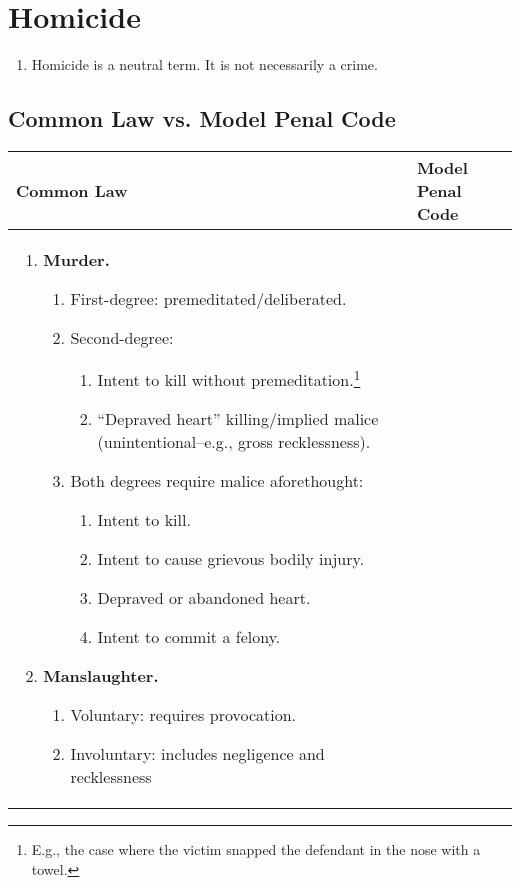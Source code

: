 \section{Homicide}

\begin{enumerate}
    \item Homicide is a neutral term. It is not necessarily a crime.
\end{enumerate}

\subsection{Common Law vs. Model Penal Code}

\begin{tabular}{ | p{5.5cm} | p{5.5cm} |}
\hline
Common Law & Model Penal Code \\ \hline
\begin{enumerate}
    \item \textbf{Murder.}
    \begin{enumerate}
        \item First-degree: premeditated/deliberated.
        \item Second-degree:
        \begin{enumerate}
            \item Intent to kill without premeditation.\footnote{E.g., the 
            case where the victim snapped the defendant in the nose with a 
            towel.}
            \item ``Depraved heart'' killing/implied malice 
            (unintentional--e.g., gross recklessness).
        \end{enumerate}
        \item Both degrees require malice aforethought:
        \begin{enumerate}
            \item Intent to kill.
            \item Intent to cause grievous bodily injury.
            \item Depraved or abandoned heart.
            \item Intent to commit a felony.
        \end{enumerate}
    \end{enumerate}
    \item \textbf{Manslaughter.}
    \begin{enumerate}
        \item Voluntary: requires provocation.
        \item Involuntary: includes negligence and recklessness 

\end{enumerate}
\end{enumerate}
\end{tabular}
